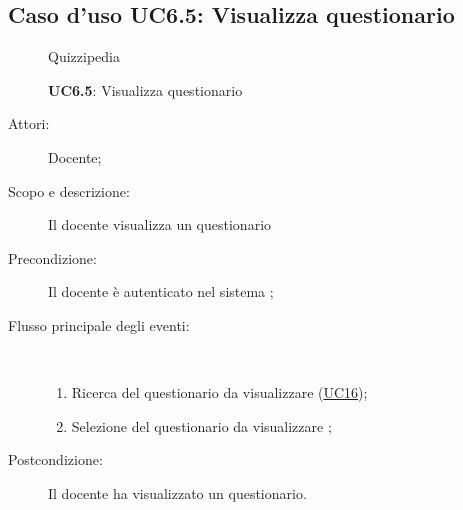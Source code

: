 \subsection{Caso d'uso UC6.5: Visualizza questionario}
	\begin{figure}[H]
		\centering
		\begin{resizedtikzpicture}{\textwidth}
		\begin{umlsystem}[x=0, fill=lightgray!20]{Quizzipedia}
		\end{umlsystem}
		\end{resizedtikzpicture}
		\caption{\textbf{UC6.5}: Visualizza questionario}
		\label{UC6.5}
	\end{figure}
\begin{description}
\item[Attori:] Docente;
\item[Scopo e descrizione:] Il docente visualizza un questionario
      \item[Precondizione:] Il docente è autenticato nel sistema
;

        \item[Flusso principale degli eventi:] \ 
 \begin{enumerate}
          \item Ricerca del questionario da visualizzare	 (\hyperlink{UC16}{UC16});
          \item Selezione del questionario da visualizzare	;

      \end{enumerate}
    \item[Postcondizione:] Il docente ha visualizzato un questionario.
  \end{description}
\hypertarget{UC7}{}
